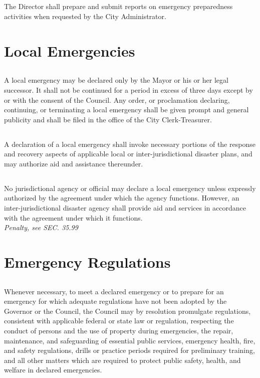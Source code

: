 \subsection{}
The Director shall prepare and submit reports on emergency preparedness activities when requested by the City Administrator.

\section{Local Emergencies}
\subsection{}
A local emergency may be declared only by the Mayor or his or her legal successor.   It shall not be continued for a period in excess of three days except by or with the consent of the Council. Any order, or proclamation declaring, continuing, or terminating a local emergency shall be given prompt and general publicity and shall be filed in the office of the City Clerk-Treasurer.
\subsection{}
A declaration of a local emergency shall invoke necessary portions of the response and recovery aspects of applicable local or inter-jurisdictional disaster plans, and may authorize aid and assistance thereunder.
\subsection{}
No jurisdictional agency or official may declare a local emergency unless expressly authorized by the agreement under which the agency functions. However, an inter-jurisdictional disaster agency shall provide aid and services in accordance with the agreement under which it functions.\\
\emph{Penalty, see SEC. 35.99}

\section{Emergency Regulations}
\subsection{}
Whenever necessary, to meet a declared emergency or to prepare for an emergency for which adequate regulations have not been adopted by the Governor or the Council, the Council may by resolution promulgate regulations, consistent with applicable federal or state law or regulation, respecting the conduct of persons and the use of property during emergencies, the repair, maintenance, and safeguarding of essential public services, emergency health, fire, and safety regulations, drills or practice periods required for preliminary training, and all other matters which are required to protect public safety, health, and welfare in declared emergencies.
